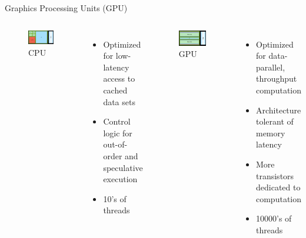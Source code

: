 \documentclass[10pt,times]{beamer}
\begin{document}
\begin{frame}{Graphics Processing Units (GPU)}
\begin{columns}
\begin{figure}
\includegraphics[width=\linewidth]{figs/CPU.png}
\caption*{CPU}
\end{figure}
\begin{itemize}
\item Optimized for low-latency access to cached data sets
\item Control logic for out-of-order and speculative execution
\item 10’s of threads
\end{itemize}

\begin{figure}
\includegraphics[width=\linewidth]{figs/GPU.png}
\caption*{GPU}
\end{figure}
\begin{itemize}
\item Optimized for data-parallel, throughput computation
\item Architecture tolerant of memory latency
\item More transistors dedicated to computation
\item 10000’s of threads
\end{itemize}


\end{columns}
\end{frame}
\end{document}

